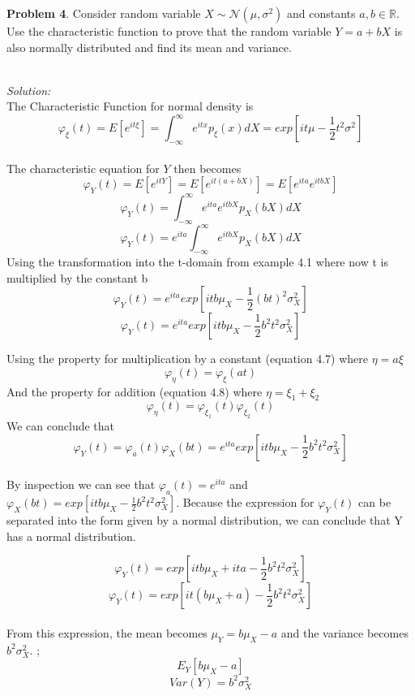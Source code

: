 \documentclass[10pt]{article}
\begin{document}
\newpage

\noindent\colorbox{mygray}{\begin{minipage}{\textwidth}
  {\bf Problem 4}.  Consider random variable $X\sim \mathcal{N}(\mu,\sigma^2)$ and constants $a,b\in\mathbb{R}$. Use the characteristic function to prove that the random variable $Y=a+bX$ is also normally distributed and find its mean and variance. 
\end{minipage}}
\\

{\em Solution:}  
\\
The Characteristic Function for normal density is
\[ \varphi_{\xi}(t)=E[e^{it\xi}]=\int_{-\infty}^{\infty}e^{itx}p_\xi(x)dX = exp[it\mu-\frac{1}{2}t^2\sigma^2] \]
\\
The characteristic equation for $Y$ then becomes
\[\varphi_Y(t)=E[e^{itY}]=E[e^{it(a+bX)}]=E[e^{ita}e^{itbX}] \]
\[\varphi_Y(t)=\int_{-\infty}^{\infty}e^{ita}e^{itbX}p_X(bX)dX \]
\[\varphi_Y(t)=e^{ita}\int_{-\infty}^{\infty}e^{itbX}p_X(bX)dX \]
Using the transformation into the t-domain from example 4.1 where now t is multiplied by the constant b
\[ \varphi_Y(t)=e^{ita}exp[itb\mu_X-\frac{1}{2}(bt)^2\sigma_X^2] \]
\[ \varphi_Y(t)=e^{ita}exp[itb\mu_X-\frac{1}{2}b^2t^2\sigma_X^2] \]

\noindent
Using the property for multiplication by a constant (equation 4.7) where $\eta=a \xi $
\[ \varphi_{\eta}(t)=\varphi_{\xi}(at) \]
And the property for addition (equation 4.8) where $\eta=\xi_1+\xi_2$
\[\varphi_\eta(t)=\varphi_{\xi_1}(t)\varphi_{\xi_2}(t) \]
We can conclude that 
\[ \varphi_Y(t)=\varphi_a(t)\varphi_{X}(bt)= e^{ita}exp[itb\mu_X-\frac{1}{2}b^2t^2\sigma_X^2]\]
\\
By inspection we can see that $\varphi_a(t)=e^{ita}$ and $\varphi_{X}(bt)=exp[itb\mu_X-\frac{1}{2}b^2t^2\sigma_X^2]$. Because the expression for $\varphi_Y(t)$ can be separated into the form given by a normal distribution, we can conclude that Y has a normal distribution. 

\[ \varphi_Y(t)=exp[itb\mu_X+ita-\frac{1}{2}b^2t^2\sigma_X^2] \]
\[ \varphi_Y(t)=exp[it(b\mu_X+a)-\frac{1}{2}b^2t^2\sigma_X^2] \]
\\
From this expression, the mean becomes $\mu_Y=b\mu_X-a$ and the variance becomes $b^2\sigma_X^2$. ;
\[ E_Y[b\mu_X-a] \]
\[ Var(Y)=b^2\sigma_X^2 \]
\end{document}
